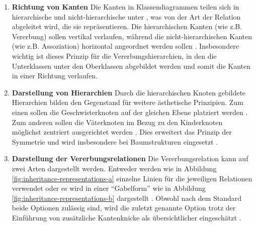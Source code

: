 \begin{enumerate}[label={\aestheticscriterialabel.\arabic*}, resume]

\item
\textbf{Richtung von Kanten}
Die Kanten in Klassendiagrammen teilen sich in hierarchische und nicht-hierarchische unter \cite{Eichelberger05Aesthetics}, was von der Art der Relation abgeleitet wird, die sie repräsentieren. Die hierarchischen Kanten (wie z.B. Vererbung) sollen vertikal verlaufen, während die nicht-hierarchischen Kanten (wie z.B. Assoziation) horizontal angeordnet werden sollen \cite{EichelbergerSchmid09Guidelines, Ambler05The-Elements}. Insbesondere wichtig ist dieses Prinzip für die Vererbungshierarchien, in den die Unterklassen unter den Oberklassen abgebildet werden und somit die Kanten in einer Richtung verlaufen.

\item
\label{pri:representation-of-hierarchies}
\textbf{Darstellung von Hierarchien}
Durch die hierarchischen Knoten gebildete Hierarchien bilden den Gegenstand für weitere ästhetische Prinzipien. Zum einen sollen die Geschwisterknoten auf der gleichen Ebene platziert werden \cite{Siebenhaller03Automatisches}. Zum anderen sollen die Väterknoten im Bezug zu den Kinderknoten möglichst zentriert ausgerichtet werden \cite{EichelbergerSchmid09Guidelines, Siebenhaller03Automatisches}. Dies erweitert das Prinzip der Symmetrie \cite{EichelbergerSchmid09Guidelines} und wird insbesondere bei Baumstrukturen eingesetzt \cite{Siebenhaller03Automatisches}.

\item
\textbf{Darstellung der Vererbungsrelationen}
Die Vererbungsrelation kann auf zwei Arten dargestellt werden. Entweder werden wie in Abbildung \ref{fig:inheritance-representations-a} einzelne Linien für die jeweiligen Relationen verwendet oder es wird in einer \enquote{Gabelform} wie in Abbildung \ref{fig:inheritance-representations-b} dargestellt \cite{Siebenhaller03Automatisches}. Obwohl nach dem Standard beide Optionen zulässig sind, wird die zuletzt genannte Option trotz der Einführung von zusätzliche Kantenknicke als übersichtlicher eingeschätzt \cite{EichelbergerSchmid09Guidelines, Siebenhaller03Automatisches}.


\end{enumerate}
